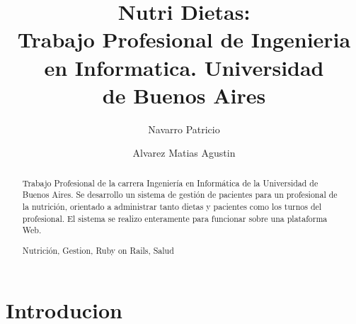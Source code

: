 \documentclass[runningheads,a4paper,spanish]{llncs}
\newcommand{\keywords}[1]{\par\addvspace\baselineskip
\noindent\keywordname\enspace\ignorespaces#1}
\begin{document}
\mainmatter  %

\title{Nutri Dietas:\\
Trabajo Profesional de Ingenieria\\
en Informatica. Universidad\\
de Buenos Aires}


%
%
\author{Navarro Patricio \and Alvarez Matias Agustin}
%


%
%

\maketitle


\begin{abstract}
Trabajo Profesional de la carrera Ingeniería en Informática de la Universidad de Buenos Aires. Se 
desarrollo un sistema de gestión de pacientes para un profesional de la nutrición, orientado a administrar tanto dietas y pacientes como los turnos del profesional. El sistema se realizo enteramente para funcionar sobre una plataforma Web.
\keywords{Nutrición, Gestion, Ruby on Rails, Salud}
\end{abstract}


\section{Introducion}
\end{document}
